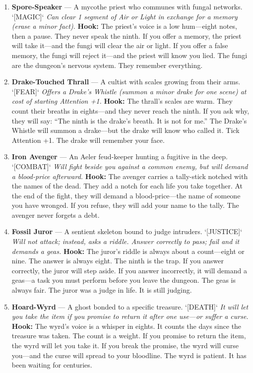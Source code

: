 \begin{enumerate}
\item \textbf{Spore-Speaker} --- A mycothe priest who communes with fungal networks. `[MAGIC]`
  \hfill \textit{Can clear 1 segment of Air or Light in exchange for a memory (erase a minor fact).}
  \textbf{Hook:} The priest's voice is a low hum---eight notes, then a pause. They never speak the ninth. If you offer a memory, the priest will take it---and the fungi will clear the air or light. If you offer a false memory, the fungi will reject it---and the priest will know you lied. The fungi are the dungeon's nervous system. They remember everything.

\item \textbf{Drake-Touched Thrall} --- A cultist with scales growing from their arms. `[FEAR]`
  \hfill \textit{Offers a Drake's Whistle (summon a minor drake for one scene) at cost of starting Attention +1.}
  \textbf{Hook:} The thrall's scales are warm. They count their breaths in eights---and they never reach the ninth. If you ask why, they will say: ``The ninth is the drake's breath. It is not for me.'' The Drake's Whistle will summon a drake---but the drake will know who called it. Tick Attention +1. The drake will remember your face.

\item \textbf{Iron Avenger} --- An Aeler feud-keeper hunting a fugitive in the deep. `[COMBAT]`
  \hfill \textit{Will fight beside you against a common enemy, but will demand a blood-price afterward.}
  \textbf{Hook:} The avenger carries a tally-stick notched with the names of the dead. They add a notch for each life you take together. At the end of the fight, they will demand a blood-price---the name of someone you have wronged. If you refuse, they will add your name to the tally. The avenger never forgets a debt.

\item \textbf{Fossil Juror} --- A sentient skeleton bound to judge intruders. `[JUSTICE]`
  \hfill \textit{Will not attack; instead, asks a riddle. Answer correctly to pass; fail and it demands a geas.}
  \textbf{Hook:} The juror's riddle is always about a count---eight or nine. The answer is always eight. The ninth is the trap. If you answer correctly, the juror will step aside. If you answer incorrectly, it will demand a geas---a task you must perform before you leave the dungeon. The geas is always fair. The juror was a judge in life. It is still judging.

\item \textbf{Hoard-Wyrd} --- A ghost bonded to a specific treasure. `[DEATH]`
  \hfill \textit{It will let you take the item if you promise to return it after one use---or suffer a curse.}
  \textbf{Hook:} The wyrd's voice is a whisper in eights. It counts the days since the treasure was taken. The count is a weight. If you promise to return the item, the wyrd will let you take it. If you break the promise, the wyrd will curse you---and the curse will spread to your bloodline. The wyrd is patient. It has been waiting for centuries.


\end{enumerate}
